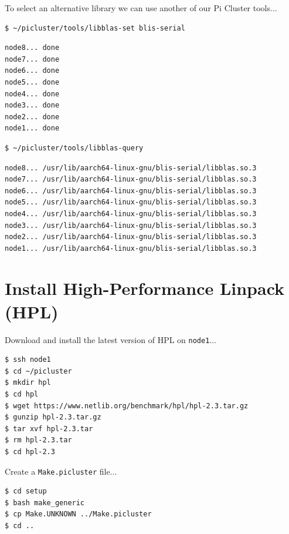 \documentclass{report}
\begin{document}
To select an alternative library we can use another of our Pi Cluster tools...

\lstset{style=termstyle}
\begin{lstlisting}[]
$ ~/picluster/tools/libblas-set blis-serial
\end{lstlisting}

\lstset{style=termstyle}
\begin{lstlisting}[]
node8... done
node7... done
node6... done 
node5... done 
node4... done 
node3... done 
node2... done 
node1... done 
\end{lstlisting}

\lstset{style=termstyle}
\begin{lstlisting}[]
$ ~/picluster/tools/libblas-query
\end{lstlisting}

\lstset{style=termstyle}
\begin{lstlisting}[]
node8... /usr/lib/aarch64-linux-gnu/blis-serial/libblas.so.3
node7... /usr/lib/aarch64-linux-gnu/blis-serial/libblas.so.3
node6... /usr/lib/aarch64-linux-gnu/blis-serial/libblas.so.3
node5... /usr/lib/aarch64-linux-gnu/blis-serial/libblas.so.3
node4... /usr/lib/aarch64-linux-gnu/blis-serial/libblas.so.3
node3... /usr/lib/aarch64-linux-gnu/blis-serial/libblas.so.3
node2... /usr/lib/aarch64-linux-gnu/blis-serial/libblas.so.3
node1... /usr/lib/aarch64-linux-gnu/blis-serial/libblas.so.3
\end{lstlisting}


%
%
\chapter{Install High-Performance Linpack (HPL)}

Download and install the latest version of HPL on \verb|node1|...

\lstset{style=termstyle}
\begin{lstlisting}
$ ssh node1
$ cd ~/picluster
$ mkdir hpl
$ cd hpl
$ wget https://www.netlib.org/benchmark/hpl/hpl-2.3.tar.gz
$ gunzip hpl-2.3.tar.gz
$ tar xvf hpl-2.3.tar
$ rm hpl-2.3.tar
$ cd hpl-2.3
\end{lstlisting}

Create a \verb|Make.picluster| file...

\lstset{style=termstyle}
\begin{lstlisting}
$ cd setup
$ bash make_generic
$ cp Make.UNKNOWN ../Make.picluster
$ cd ..
\end{lstlisting}
\end{document}
